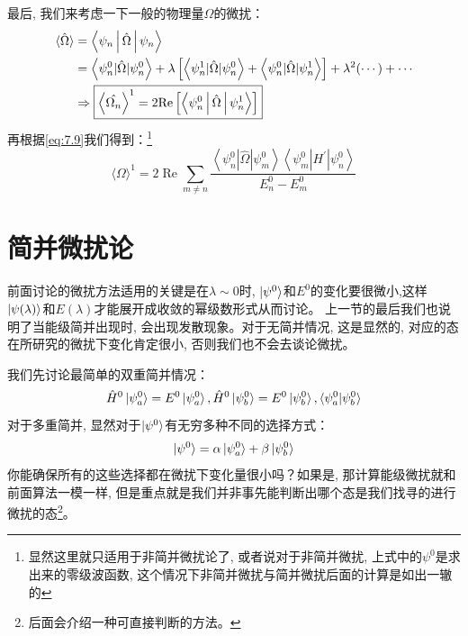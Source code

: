 \documentclass[a4paper,zihao=-4,linespread=1]{ctexrep}
\begin{document}
    最后, 我们来考虑一下一般的物理量$\Omega$的微扰：
    \begin{align*}
        \braket{\hat{\Omega}}&=\Braket{\psi_n|\hat{\Omega}|\psi_n}\\
        &=\left\langle\psi_{n}^{0}|\hat{\Omega}| \psi_{n}^{0}\right\rangle+\lambda\left[\left\langle\psi_{n}^{1}|\hat{\Omega}| \psi_{n}^{0}\right\rangle+\left\langle\psi_{n}^{0}|\hat{\Omega}| \psi_{n}^{1}\right\rangle\right]+\lambda^{2}(\cdots)+\cdots\\
        &\Rightarrow \boxed{\Braket{\hat{\Omega_n}}^1=2\mathrm{Re}\left[\Braket{\psi_n^0|\hat{\Omega}|\psi_n^1}\right]}
    \end{align*}
    再根据\ref{eq:7.9}我们得到：\footnote{显然这里就只适用于非简并微扰论了, 或者说对于非简并微扰, 上式中的$\psi^0$是求出来的零级波函数, 这个情况下非简并微扰与简并微扰后面的计算是如出一辙的}
    \begin{equation}
        \langle\Omega\rangle^{1}=2 \operatorname{Re} \sum_{m \neq n} \frac{\left\langle\psi_{n}^{0}|\hat{\Omega}| \psi_{m}^{0}\right\rangle\left\langle\psi_{m}^{0}\left|H^{\prime}\right| \psi_{n}^{0}\right\rangle}{E_{n}^{0}-E_{m}^{0}}
    \end{equation}
    \section{简并微扰论}
    前面讨论的微扰方法适用的关键是在$\lambda\sim0$时, $\ket{\psi^0}$和$E^0$的变化要很微小,这样$\ket{\psi(\lambda)}$和$E(\lambda)$才能展开成收敛的幂级数形式从而讨论。
    上一节的最后我们也说明了当能级简并出现时, 会出现发散现象。对于无简并情况, 这是显然的, 对应的态在所研究的微扰下变化肯定很小, 否则我们也不会去谈论微扰。
    
    我们先讨论最简单的双重简并情况：
    \[\hat{H}^0\ket{\psi_a^0}=E^0\ket{\psi_a^0},\hat{H}^0\ket{\psi_b^0}=E^0\ket{\psi_b^0}, \braket{\psi_a^0|\psi_b^0}\]
    对于多重简并, 显然对于$\ket{\psi^0}$有无穷多种不同的选择方式：
    \[\ket{\psi^0}=\alpha\ket{\psi_a^0}+\beta\ket{\psi_b^0}\]
    你能确保所有的这些选择都在微扰下变化量很小吗？如果是, 那计算能级微扰就和前面算法一模一样, 但是重点就是我们并非事先能判断出哪个态是我们找寻的进行微扰的态\footnote{后面会介绍一种可直接判断的方法。}。
\end{document}
